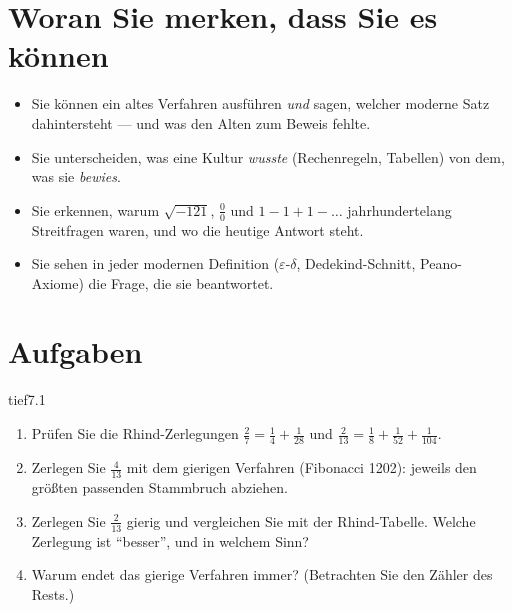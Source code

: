 \section{Woran Sie merken, dass Sie es können}
\begin{itemize}[leftmargin=1.2em,itemsep=2pt]
\item Sie können ein altes Verfahren ausführen \emph{und} sagen, welcher moderne Satz dahintersteht --- und was den Alten zum Beweis fehlte.
\item Sie unterscheiden, was eine Kultur \emph{wusste} (Rechenregeln, Tabellen) von dem, was sie \emph{bewies}.
\item Sie erkennen, warum $\sqrt{-121}$, $\frac00$ und $1 - 1 + 1 - \dots$ jahrhundertelang Streitfragen waren, und wo die heutige Antwort steht.
\item Sie sehen in jeder modernen Definition ($\varepsilon$-$\delta$, Dedekind-Schnitt, Peano-Axiome) die Frage, die sie beantwortet.
\end{itemize}

\section{Aufgaben}

\begin{karte}{tief}{7.1}{\typtypisch}{}
\begin{enumerate}[label=(\alph*),leftmargin=1.6em,itemsep=2pt]
\item Prüfen Sie die Rhind-Zerlegungen $\frac27 = \frac14 + \frac1{28}$ und $\frac2{13} = \frac18 + \frac1{52} + \frac1{104}$.
\item Zerlegen Sie $\frac4{13}$ mit dem gierigen Verfahren (Fibonacci 1202): jeweils den größten passenden Stammbruch abziehen.
\item Zerlegen Sie $\frac2{13}$ gierig und vergleichen Sie mit der Rhind-Tabelle. Welche Zerlegung ist \enquote{besser}, und in welchem Sinn?
\item Warum endet das gierige Verfahren immer? (Betrachten Sie den Zähler des Rests.)
\end{enumerate}
\end{karte}

